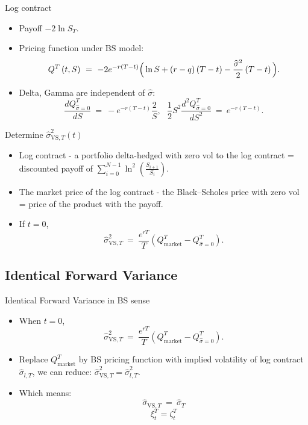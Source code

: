 \documentclass{beamer}
\begin{document}
    \begin{frame}{Log contract}
        \begin{itemize}
            \item Payoff $-2\ln S_{T}$.
            \item Pricing function under BS model: \[Q^{T}\left(t,S\right)\ =\ -2e^{-r(T-t)}\Big{(}\ln S+\left(r-q\right)\left(T-t \right)-\frac{\widehat{\sigma}^{2}}{2}\left(T-t\right)\Big{)}. \]
            \item Delta, Gamma are independent of $\hat{\sigma}$:
            \[\frac{dQ^{T}_{\widehat{\sigma}=0}}{dS}\ =\ -e^{-r(T-t)}\frac{2}{S},\ \ \ \frac{1}{2}S^{2}\frac{d^{2}Q^{T}_{\widehat{\sigma}=0}}{dS^{2}}\ =\ e^{-r(T-t)}.\]
        \end{itemize}
    \end{frame}
    \begin{frame}{Determine $\widehat{\sigma}_{\text{VS},T}^{2}\left(t\right)$}
    \begin{itemize}
        \item Log contract - a portfolio delta-hedged with zero vol to the log contract = discounted payoff of $\sum_{i=0}^{N-1}\ln^{2}\left(\frac{S_{i+1}}{S_{i}}\right).$ 
        \item The market price of the log contract -  the Black–Scholes price with zero vol = price of the product with the payoff.
        \item If $t=0$, $$\widehat{\sigma}^{2}_{\text{VS},T}\ =\ \frac{e^{rT}}{T}\left(Q^{T}_{\text{market}}-Q^{T }_{\widehat{\sigma}=0}\right).$$
    \end{itemize}
    \end{frame}
 \subsection{Identical Forward Variance}
    \begin{frame}{Identical Forward Variance in BS sense}
        \begin{itemize}
            \item When $t=0$, $$\widehat{\sigma}^{2}_{\text{VS},T}\ =\ \frac{e^{rT}}{T}\left(Q^{T}_{\text{market}}-Q^{T }_{\widehat{\sigma}=0}\right).$$
        \item Replace $Q^{T}_{\text{market}}$ by BS pricing function with implied volatility of log contract $\hat{\sigma}_{l,T}$, we can reduce:
        $\hat{\sigma}^{2}_{\text{VS},T} = \hat{\sigma}^{2}_{l,T}$.
        \item Which means:
        \[\widehat{\sigma}_{\text{VS},T} \ =\ \widehat{\sigma}_{T} \] \[\xi^{T}_{t} =\zeta^{T}_{t} \]
        \end{itemize}
    \end{frame}
\end{document}
